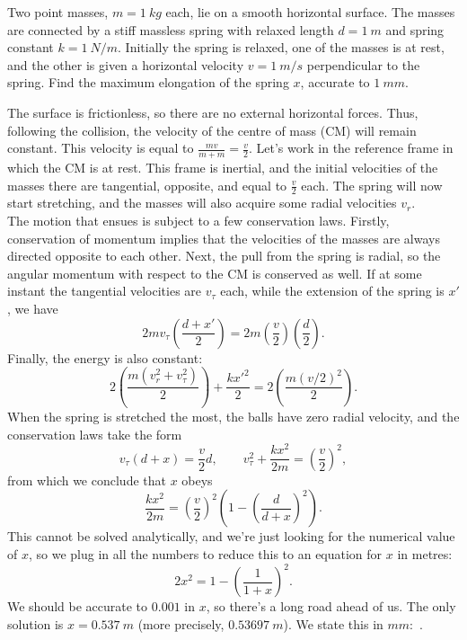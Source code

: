 \documentclass[../TST.tex]{subfiles}
\begin{document}
\begin{pproblem}
Two point masses, $m=\qty{1}{kg}$ each, lie on a smooth horizontal surface. The masses are connected by a stiff massless spring with relaxed length $d=\qty{1}{m}$ and spring constant $k=\qty{1}{N/m}$. Initially the spring is relaxed, one of the masses is at rest, and the other is given a horizontal velocity $v=\qty{1}{m/s}$ perpendicular to the spring. Find the maximum elongation of the spring $x$, accurate to $\qty{1}{mm}$.
\end{pproblem}

\ifprob \else
	\begin{solution} The surface is frictionless, so there are no external horizontal forces. Thus, following the collision, the velocity of the centre of mass (CM) will remain constant. This velocity is equal to $\frac{mv}{m+m}=\frac{v}{2}$. Let's work in the reference frame in which the CM is at rest. This frame is inertial, and the initial velocities of the masses there are tangential, opposite, and equal to $\frac{v}{2}$ each. The spring will now start stretching, and the masses will also acquire some radial velocities $v_r$. \\[5pt]
		The motion that ensues is subject to a few conservation laws. Firstly, conservation of momentum implies that the velocities of the masses are always directed opposite to each other. Next, the pull from the spring is radial, so the angular momentum with respect to the CM is conserved as well. If at some instant the tangential velocities are $v_\tau$ each, while the extension of the spring is $x'$, we have
		\begin{equation*}
		2mv_\tau \left(\frac{d+x'}{2}\right) = 2 m \left(\frac{v}{2}\right) \left(\frac{d}{2}\right) 
		.
		\end{equation*}
Finally, the energy is also constant:
\begin{equation*}
2\left(\frac{m(v_r^2+v_\tau^2)}{2}\right) + \frac{kx'^2}{2} = 2 \left(\frac{m(v/2)^2}{2}\right) 
.
\end{equation*}
When the spring is stretched the most, the balls have zero radial velocity, and the conservation laws take the form
\begin{equation*}
		v_\tau (d+x)= \frac{v}{2}d, \quad\quad v_\tau^2+\frac{kx^2}{2m}=\left(\frac{v}{2}\right)^2
,
\end{equation*}
from which we conclude that $x$ obeys
\begin{equation*}
\frac{kx^2}{2m}=\left(\frac{v}{2}\right)^2\left(1-\left(\frac{d}{d+x}\right)^2 \right) 
.
\end{equation*}
This cannot be solved analytically, and we're just looking for the numerical value of $x$, so we plug in all the numbers to reduce this to an equation for $x$ in metres:
\begin{equation*}
2x^2=1-\left(\frac{1}{1+x}\right)^2
.
\end{equation*}
We should be accurate to $0.001$ in $x$, so there's a long road ahead of us. The only solution is $x=\qty{0.537}{m}$ (more precisely, $\qty{0.53697}{m}$). We state this in $\unit{mm}$: \,.
\end{solution}
\fi
\end{document}
